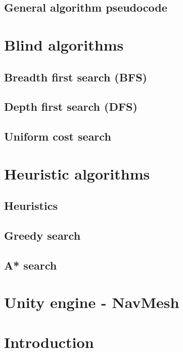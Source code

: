 \documentclass{beamer}
\begin{document}
\subsection{General algorithm pseudocode}


\section{Blind algorithms}

\subsection{Breadth first search (BFS)}

\subsection{Depth first search (DFS)}

\subsection{Uniform cost search}


\section{Heuristic algorithms}

\subsection{Heuristics}

\subsection{Greedy search}

\subsection{A* search}


\section{Unity engine - NavMesh}



\section{Introduction}
\end{document}

